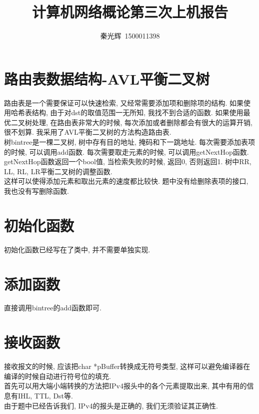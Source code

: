 \documentclass[a4paper,12pt,notitlepage]{article}
\begin{document}
\title{计算机网络概论第三次上机报告}
\author{秦光辉\ 1500011398}
\maketitle

\section{路由表数据结构-AVL平衡二叉树}

	路由表是一个需要保证可以快速检索, 又经常需要添加项和删除项的结构. 如果使用哈希表结构, 由于对dst的取值范围一无所知, 我找不到合适的函数. 如果使用最优二叉树处理, 在路由表非常大的时候, 每次添加或者删除都会有很大的运算开销, 很不划算. 我采用了AVL平衡二叉树的方法构造路由表. \\
	
	树bintree是一棵二叉树, 树中存有目的地址, 掩码和下一跳地址. 每次需要添加表项的时候, 可以调用add函数. 每次需要取走元素的时候, 可以调用getNextHop函数. getNextHop函数返回一个bool值, 当检索失败的时候, 返回0, 否则返回1. 树中RR, LL, RL, LR平衡二叉树的调整函数. \\
	
	这样可以使得添加元素和取出元素的速度都比较快. 题中没有给删除表项的接口, 我也没有写删除函数. 
	
\section{初始化函数}

	初始化函数已经写在了类中, 并不需要单独实现. 

\section{添加函数}

	直接调用bintree的add函数即可.
	
\section{接收函数}

	接收报文的时候, 应该把char *pBuffer转换成无符号类型, 这样可以避免编译器在编译的时候自动进行符号位的填充. \\
	
	首先可以用大端小端转换的方法把IPv4报头中的各个元素提取出来, 其中有用的信息有IHL, TTL, Dst等. \\
	
	由于题中已经告诉我们, IPv4的报头是正确的, 我们无须验证其正确性. \\
	
\end{document}
